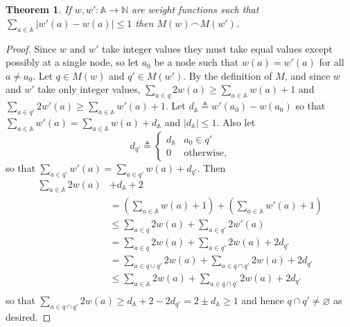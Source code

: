 \documentclass[journal]{IEEEtran}
\newtheorem{theorem}{Theorem}
\begin{document}

\appendices

\section{}\label{weights-appendix}

\begin{theorem} \label{weights-nearly-equal} If $w, w' : \mathbb A \to \mathbb
N$ are weight functions such that $\sum_{a \in \mathbb A} |w'(a) - w(a)| \le 1$
then $M(w) \frown M(w')$.  \end{theorem}

\begin{proof}Since $w$ and $w'$ take integer values they must take equal values
  except possibly at a single node, so let $a_0$ be a node such that $w(a) =
  w'(a)$ for all $a \ne a_0$.
%
Let $q \in M(w)$ and $q' \in M(w')$. By the definition of $M$, and since $w$
and $w'$ take only integer values,
%
$\sum_{a \in q} 2 w(a) \ge \sum_{a \in \mathbb A} w(a) + 1$
%
and
%
$\sum_{a \in q'} 2 w'(a) \ge \sum_{a \in \mathbb A} w'(a) + 1$.
%
Let $d_{\mathbb A} \triangleq w'(a_0) - w(a_0)$ so that $\sum_{a \in \mathbb A}
w'(a) = \sum_{a \in \mathbb A} w(a) + d_{\mathbb A}$ and $|d_\mathbb A| \le 1$.
Also let \[ d_{q'} \triangleq \begin{cases}
%
d_{\mathbb A} & a_0 \in q' \\
%
0 & \textrm{otherwise,}
%
\end{cases} \] so that $\sum_{a \in q'} w'(a) = \sum_{a \in q'} w(a) + d_{q'}$.
%
Then
%
\[\begin{split}
%
\sum_{a \in \mathbb A} 2w(a) &+ d_{\mathbb A} + 2 \\
%
&= \left( \sum_{a \in \mathbb A} w(a)  + 1\right) +  \left( \sum_{a \in \mathbb
A} w'(a) + 1\right) \\
%
&\le \sum_{a \in q}  2w(a) +    \sum_{a \in q'} 2w'(a) \\
%
&= \sum_{a \in q}  2w(a) +  \sum_{a \in q'} 2w(a) + 2d_{q'}\\
%
&= \sum_{a \in q \cup q'} 2w(a) +  \sum_{a \in q \cap q'} 2w(a) + 2d_{q'}\\
%
&\le \sum_{a \in \mathbb A} 2w(a) +    \sum_{a \in q \cap q'} 2w(a) + 2d_{q'}\\
%
\end{split}\] so that $\sum_{a \in q \cap q'} 2w(a) \ge d_{\mathbb A} + 2 -
2d_{q'} = 2 \pm d_\mathbb A \ge 1$ and hence $q \cap q' \ne \varnothing$ as
desired.  \end{proof}
\end{document}
